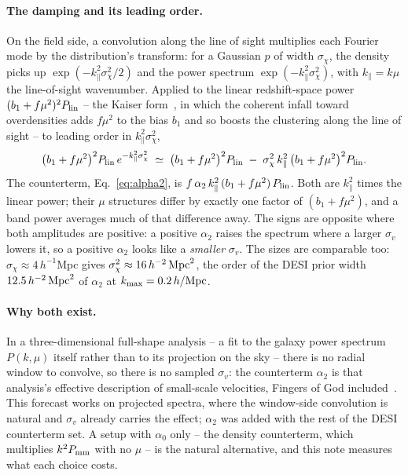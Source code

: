 \documentclass[11pt]{article}
\newcommand{\kmax}{k_{\rm max}}
\newcommand{\hMpc}{\,h/{\rm Mpc}}
\newcommand{\aunit}{\,h^{-2}\,{\rm Mpc}^2}
\newcommand{\sv}{\sigma_v}
\begin{document}
\paragraph{The damping and its leading order.}
On the field side, a convolution along the line of sight multiplies
each Fourier mode by the distribution's transform: for a Gaussian $p$
of width $\sigma_\chi$, the density picks up
$\exp(-k_\parallel^2\sigma_\chi^2/2)$ and the power spectrum
$\exp(-k_\parallel^2\sigma_\chi^2)$, with $k_\parallel = k\mu$ the
line-of-sight wavenumber.  Applied to the linear redshift-space power
$(b_1 + f\mu^2)^2 P_{\rm lin}$ -- the Kaiser form~\cite{Kaiser1987},
in which the coherent infall toward overdensities adds $f\mu^2$ to the
bias $b_1$ and so boosts the clustering along the line of sight -- to
leading order in
$k_\parallel^2\sigma_\chi^2$,
\begin{equation}
  \bigl(b_1 + f\mu^2\bigr)^2 P_{\rm lin}\,
  e^{-k_\parallel^2\sigma_\chi^2}
  \;\simeq\;
  \bigl(b_1 + f\mu^2\bigr)^2 P_{\rm lin}
  \;-\; \sigma_\chi^2\, k_\parallel^2\,
  \bigl(b_1 + f\mu^2\bigr)^2 P_{\rm lin} .
  \label{eq:damping}
\end{equation}
The counterterm, Eq.~\eqref{eq:alpha2}, is
$f\,\alpha_2\,k_\parallel^2\,(b_1 + f\mu^2)\,P_{\rm lin}$.  Both are
$k_\parallel^2$ times the linear power; their $\mu$ structures differ
by exactly one factor of $(b_1 + f\mu^2)$, and a band power averages
much of that difference away.  The signs are opposite where both
amplitudes are positive: a positive $\alpha_2$ raises the spectrum
where a larger $\sv$ lowers it, so a positive $\alpha_2$ looks like a
\emph{smaller} $\sv$.  The sizes are comparable too:
$\sigma_\chi \approx 4\,h^{-1}$Mpc gives
$\sigma_\chi^2 \approx 16\aunit$, the order of the DESI prior width
$12.5\aunit$ of $\alpha_2$ at $\kmax = 0.2\hMpc$.

\paragraph{Why both exist.}
In a three-dimensional full-shape analysis -- a fit to the galaxy
power spectrum $P(k, \mu)$ itself rather than to its projection on the
sky -- there is no radial window to convolve, so there is no sampled
$\sv$: the counterterm $\alpha_2$
is that analysis's effective description of small-scale velocities,
Fingers of God included~\cite{Maus2024,DESI2024V}.  This forecast
works on projected spectra, where the window-side convolution is
natural and $\sv$ already carries the effect; $\alpha_2$ was added
with the rest of the DESI counterterm set.  A setup with $\alpha_0$
only -- the density counterterm, which multiplies $k^2 P_{\rm mm}$
with no $\mu$ -- is the natural alternative, and this note measures
what each choice costs.
\end{document}

